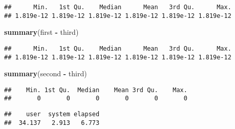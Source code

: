 \documentclass[]{article}
\newenvironment{Shaded}{\begin{snugshade}}{\end{snugshade}}
\newcommand{\CommentTok}[1]{\textcolor[rgb]{0.56,0.35,0.01}{\textit{#1}}}
\newcommand{\KeywordTok}[1]{\textcolor[rgb]{0.13,0.29,0.53}{\textbf{#1}}}
\newcommand{\NormalTok}[1]{#1}
\newcommand{\OperatorTok}[1]{\textcolor[rgb]{0.81,0.36,0.00}{\textbf{#1}}}
\newcommand{\StringTok}[1]{\textcolor[rgb]{0.31,0.60,0.02}{#1}}
\begin{document}
\begin{verbatim}
##      Min.   1st Qu.    Median      Mean   3rd Qu.      Max. 
## 1.819e-12 1.819e-12 1.819e-12 1.819e-12 1.819e-12 1.819e-12
\end{verbatim}

\begin{Shaded}
\begin{Highlighting}[]
\KeywordTok{summary}\NormalTok{(first }\OperatorTok{-}\StringTok{ }\NormalTok{third)}
\end{Highlighting}
\end{Shaded}

\begin{verbatim}
##      Min.   1st Qu.    Median      Mean   3rd Qu.      Max. 
## 1.819e-12 1.819e-12 1.819e-12 1.819e-12 1.819e-12 1.819e-12
\end{verbatim}

\begin{Shaded}
\begin{Highlighting}[]
\KeywordTok{summary}\NormalTok{(second }\OperatorTok{-}\StringTok{ }\NormalTok{third)}
\end{Highlighting}
\end{Shaded}

\begin{verbatim}
##    Min. 1st Qu.  Median    Mean 3rd Qu.    Max. 
##       0       0       0       0       0       0
\end{verbatim}

\begin{Shaded}
\end{Shaded}

\begin{verbatim}
##    user  system elapsed 
##  34.137   2.913   6.773
\end{verbatim}

\begin{Shaded}
\end{Shaded}
\end{document}
